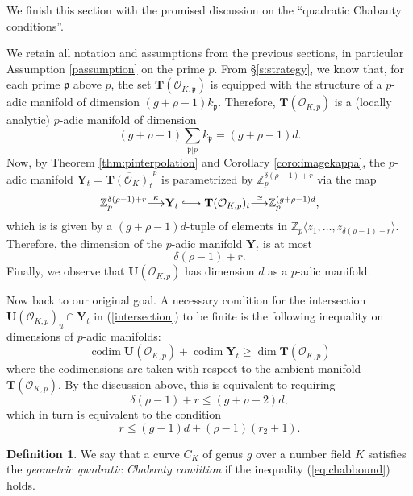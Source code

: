 \documentclass[11pt,oneside]{amsart}
\theoremstyle{plain}
\theoremstyle{definition}
\newtheorem{definition}[theorem]{Definition}
\def\lra{{\longrightarrow}}
\DeclareMathOperator{\codim}{codim}
\def\fp{\mathfrak{p}}
\def\TT{\mathbf{T}}
\def\Z{\mathbb{Z}}
\def\F{\mathbb{F}}
\def\U{\mathbf{U}}
\def\Y{\mathbf{Y}}
\def\oh{\mathcal{O}}
\def\longhookrightarrow{\lhook\joinrel\longrightarrow}
\begin{document}
We finish this section with the promised discussion on the ``quadratic Chabauty conditions''. 

We retain all notation and assumptions from the previous sections, in particular Assumption \ref{passumption} on the prime $p$. 
From \S \ref{s:strategy}, we know that, for each prime $\mathfrak{p}$ above $p$, the set $\TT(\oh_{K, \mathfrak{p}})$ is equipped with the structure of a $p$-adic manifold of dimension $(g+\rho-1)k_\fp$. Therefore, $\TT(\oh_{K, p})$ is a (locally analytic) $p$-adic manifold of dimension 
$$(g+\rho-1)\sum_{\fp\vert p} k_\fp=(g+\rho-1)d.$$ 
Now, by Theorem \ref{thm:pinterpolation} and Corollary \ref{coro:imagekappa}, the $p$-adic manifold $\Y_t = \overline{\TT(\oh_K)_t}^p$ is parametrized by $\Z_p^{\delta(\rho-1)+r}$ via the map 
$$
\Z_p^{\delta(\rho-1)+r}\overset{\kappa}{\lra} \Y_t \longhookrightarrow \TT(\oh_{K,p})_t \overset{\simeq}{\lra} \Z_p^{(g+\rho-1)d},
$$
which is is given by a $(g+\rho-1)d$-tuple of elements in $\Z_p\langle z_1,\ldots, z_{\delta(\rho-1)+r} \rangle$. Therefore, the dimension  of the  $p$-adic manifold $\Y_t$ is at most 
$$\delta(\rho-1)+r.$$
Finally, we observe that $\U(\oh_{K, p})$ has dimension $d$ as a $p$-adic manifold. 


Now back to our original goal. A necessary condition for the intersection $\U(\oh_{K, p})_u \cap \Y_t$ in (\ref{intersection}) to be finite is the following inequality on dimensions of $p$-adic manifolds: 
$$
\codim \U(\oh_{K, p}) + \codim \Y_t \geq \dim \TT(\oh_{K, p}) 
$$
where the codimensions are taken with respect to the ambient manifold $\TT(\oh_{K, p})$.
By the discussion above, this is equivalent to requiring
$$\delta(\rho-1)+r \leq (g+\rho-2)d,$$ which in turn is equivalent to the condition
\begin{equation}\label{eq:chabbound}
    r\leq (g-1)d+(\rho-1)(r_2+1).
\end{equation}


\begin{definition} \label{definition:chabcondition}
We say that a curve $C_K$ of genus $g$ over a number field $K$ satisfies the  {\it geometric quadratic Chabauty condition} if 
the inequality (\ref{eq:chabbound}) holds. 
\end{definition}
\end{document}
